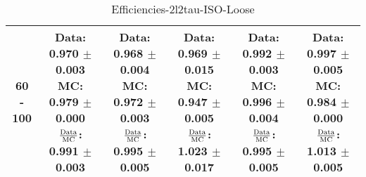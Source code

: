 \documentclass[final,letterpaper,twoside,12pt]{article}
\begin{document}
\begin{table}[htbp]
\begin{adjustwidth}{-4em}{-4em}
\begin{tabular}{|c|c|c|c|c|c|}
60 - 100 & \parbox[c]{1.1 in}{ \scriptsize  Data: 0.970 $\pm$ 0.003 \newline MC: 0.979 $\pm$ 0.000 \newline $\frac{\rm{Data}}{\rm{MC}}$: 0.991 $\pm$ 0.003} & \parbox[c]{1.1 in}{ \scriptsize  Data: 0.968 $\pm$ 0.004 \newline MC: 0.972 $\pm$ 0.003 \newline $\frac{\rm{Data}}{\rm{MC}}$: 0.995 $\pm$ 0.005} & \parbox[c]{1.1 in}{ \scriptsize  Data: 0.969 $\pm$ 0.015 \newline MC: 0.947 $\pm$ 0.005 \newline $\frac{\rm{Data}}{\rm{MC}}$: 1.023 $\pm$ 0.017} & \parbox[c]{1.1 in}{ \scriptsize  Data: 0.992 $\pm$ 0.003 \newline MC: 0.996 $\pm$ 0.004 \newline $\frac{\rm{Data}}{\rm{MC}}$: 0.995 $\pm$ 0.005} & \parbox[c]{1.1 in}{ \scriptsize  Data: 0.997 $\pm$ 0.005 \newline MC: 0.984 $\pm$ 0.000 \newline $\frac{\rm{Data}}{\rm{MC}}$: 1.013 $\pm$ 0.005}\\ \hline 
\end{tabular}
\caption {Efficiencies-2l2tau-ISO-Loose}
\label{tab:cqdata0}
\end{adjustwidth}\end{table}
\end{document}
